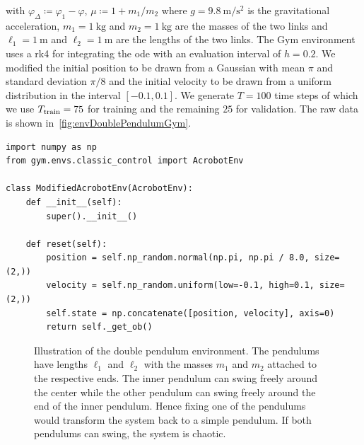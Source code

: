 			with \( \varphi_\Delta \coloneqq \varphi_1 - \varphi \), \( \mu \coloneqq 1 + m_1/m_2 \) where \( g = \SI{9.8}{\meter\per\second\squared} \) is the gravitational acceleration, \( m_1 = \SI{1}{\kilogram} \) and \( m_2 = \SI{1}{\kilogram} \) are the masses of the two links and \( \ell_1 = \SI{1}{\meter} \) and \( \ell_2 = \SI{1}{\meter} \) are the lengths of the two links. The Gym environment uses a \ac{rk4} for integrating the \ac{ode} with an evaluation interval of \( h = 0.2 \). We modified the initial position to be drawn from a Gaussian with mean \( \pi \) and standard deviation \( \pi/8 \) and the initial velocity to be drawn from a uniform distribution in the interval \( [-0.1, 0.1] \). We generate \( T = 100 \) time steps of which we use \( T_{\mathrm{train}} = 75 \) for training and the remaining \(25\) for validation. The raw data is shown in~\autoref{fig:envDoublePendulumGym}.

			\begin{lstlisting}[caption={Modification of Gym's acrobot environment to start at the top instead of hanging down.}, label=lst:topAcrobot]
import numpy as np
from gym.envs.classic_control import AcrobotEnv

class ModifiedAcrobotEnv(AcrobotEnv):
	def __init__(self):
		super().__init__()

	def reset(self):
		position = self.np_random.normal(np.pi, np.pi / 8.0, size=(2,))
		velocity = self.np_random.uniform(low=-0.1, high=0.1, size=(2,))
		self.state = np.concatenate([position, velocity], axis=0)
		return self._get_ob()
			\end{lstlisting}

			\begin{figure}
				\centering
				\tikzDoublePendulum
				\caption{Illustration of the double pendulum environment. The pendulums have lengths \(\ell_1\) and \(\ell_2\) with the masses \(m_1\) and \(m_2\) attached to the respective ends. The inner pendulum can swing freely around the center while the other pendulum can swing freely around the end of the inner pendulum. Hence fixing one of the pendulums would transform the system back to a simple pendulum. If both pendulums can swing, the system is chaotic.}
				\label{fig:envDoublePendulumGymSketch}
			\end{figure}

